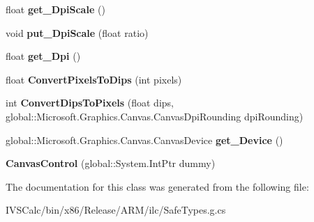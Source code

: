 \begin{DoxyCompactItemize}
\item 
\mbox{\label{class_microsoft_1_1_graphics_1_1_canvas_1_1_u_i_1_1_xaml_1_1_canvas_control_a56d9356dc66e6dcf13a6fe9f68148a9f}} 
float {\bfseries get\+\_\+\+Dpi\+Scale} ()
\item 
\mbox{\label{class_microsoft_1_1_graphics_1_1_canvas_1_1_u_i_1_1_xaml_1_1_canvas_control_ac93ee9daef7c500b489c7d75ea50a9c1}} 
void {\bfseries put\+\_\+\+Dpi\+Scale} (float ratio)
\item 
\mbox{\label{class_microsoft_1_1_graphics_1_1_canvas_1_1_u_i_1_1_xaml_1_1_canvas_control_a153a81ae73a3695b423fcc92a0f866f5}} 
float {\bfseries get\+\_\+\+Dpi} ()
\item 
\mbox{\label{class_microsoft_1_1_graphics_1_1_canvas_1_1_u_i_1_1_xaml_1_1_canvas_control_a2ce8d949d75e058b2815e29c1dbfbeae}} 
float {\bfseries Convert\+Pixels\+To\+Dips} (int pixels)
\item 
\mbox{\label{class_microsoft_1_1_graphics_1_1_canvas_1_1_u_i_1_1_xaml_1_1_canvas_control_a6f9406f13bc216c0fe902d20beb8d936}} 
int {\bfseries Convert\+Dips\+To\+Pixels} (float dips, global\+::\+Microsoft.\+Graphics.\+Canvas.\+Canvas\+Dpi\+Rounding dpi\+Rounding)
\item 
\mbox{\label{class_microsoft_1_1_graphics_1_1_canvas_1_1_u_i_1_1_xaml_1_1_canvas_control_a53150d7d2beb847f94799b8c1be75e7a}} 
global\+::\+Microsoft.\+Graphics.\+Canvas.\+Canvas\+Device {\bfseries get\+\_\+\+Device} ()
\item 
\mbox{\label{class_microsoft_1_1_graphics_1_1_canvas_1_1_u_i_1_1_xaml_1_1_canvas_control_a31a6da4afc396ee8034865c568463129}} 
{\bfseries Canvas\+Control} (global\+::\+System.\+Int\+Ptr dummy)
\end{DoxyCompactItemize}


The documentation for this class was generated from the following file\+:\begin{DoxyCompactItemize}
\item 
I\+V\+S\+Calc/bin/x86/\+Release/\+A\+R\+M/ilc/Safe\+Types.\+g.\+cs\end{DoxyCompactItemize}
